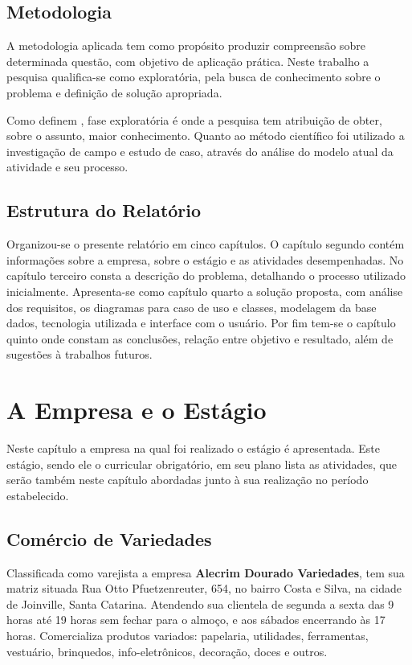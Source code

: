 \documentclass[
	12pt,
	openright,
	oneside, %
	a4paper,
	chapter=TITLE,
	section=TITLE,
	english,
	brazil %
	]{abntex2-udesc}
\begin{document}
\section{Metodologia}

A metodologia aplicada tem como propósito produzir compreensão sobre determinada questão, com objetivo de aplicação prática. Neste trabalho a pesquisa qualifica-se como exploratória, pela busca de conhecimento sobre o problema e definição de solução apropriada.

Como definem , fase exploratória é onde a pesquisa tem atribuição de obter, sobre o assunto, maior conhecimento. Quanto ao método científico foi utilizado a investigação de campo e estudo de caso, através do análise do modelo atual da atividade e seu processo.

\section{Estrutura do Relatório}

Organizou-se o presente relatório em cinco capítulos. O capítulo segundo contém informações sobre a empresa, sobre o estágio e as atividades desempenhadas. No capítulo terceiro consta a descrição do problema, detalhando o processo utilizado inicialmente. Apresenta-se como capítulo quarto a solução proposta, com análise dos requisitos, os diagramas para caso de uso e classes, modelagem da base dados, tecnologia utilizada e interface com o usuário. Por fim tem-se o capítulo quinto onde constam as conclusões, relação entre objetivo e resultado, além de sugestões à trabalhos futuros.

\chapter{A Empresa e o Estágio}

Neste capítulo a empresa na qual foi realizado o estágio é apresentada. Este estágio, sendo ele o curricular obrigatório, em seu plano lista as atividades, que serão também neste capítulo abordadas junto à sua realização no período estabelecido.

\section{Comércio de Variedades}

Classificada como varejista a empresa \textbf{Alecrim Dourado Variedades}, tem sua matriz situada Rua Otto Pfuetzenreuter, 654, no bairro Costa e Silva, na cidade de Joinville, Santa Catarina. Atendendo sua clientela de segunda a sexta das 9 horas até 19 horas sem fechar para o almoço, e aos sábados encerrando às 17 horas. Comercializa produtos variados: papelaria, utilidades, ferramentas, vestuário, brinquedos, info-eletrônicos, decoração, doces e outros.
\end{document}

